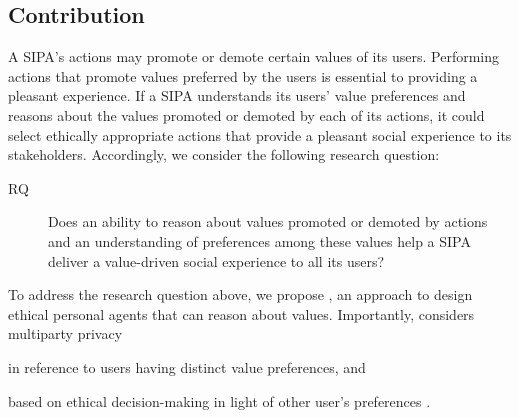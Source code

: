 

\subsection{Contribution}
A SIPA's actions may promote or demote certain values of its users. 
Performing actions that promote values preferred by the users is essential to providing a pleasant experience. 
%
If a SIPA understands its users' value preferences
and reasons about the values promoted or demoted by each of its actions, it 
could select ethically appropriate actions that provide a pleasant social experience to its stakeholders.
Accordingly, we consider the following research question: 

\begin{description}
\item[RQ] Does an ability to reason about values promoted or demoted by actions and an understanding of preferences among these values help a SIPA deliver a value-driven social experience to all its users? 
\end{description}

To address the research question above, we propose \frameworkAinur, an
approach to design ethical personal agents that can reason about values.
Importantly, \frameworkAinur considers multiparty privacy 
\begin{enuminline}
\item in reference to users having distinct value preferences, and 
\item based on ethical decision-making in light of other user's preferences \citep{TOCHI-17:Multiuser}.
\end{enuminline} 

